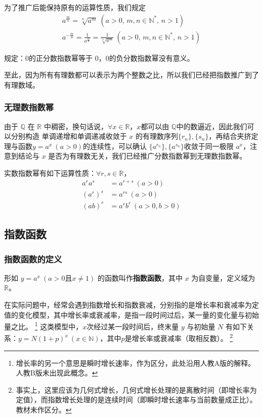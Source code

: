 \documentclass[a4paper,openany]{ctexbook}
\begin{document}
为了推广后能保持原有的运算性质，我们规定
\begin{gather*}
    a^{\frac{m}{n}}=\sqrt[n]{a^m}\ (a>0,\, m,n\in \mathbb{N} ^*,\, n>1)\\
    a^{-\frac{m}{n}}=\frac{1}{a^{\frac{m}{n}}}=\frac{1}{\sqrt[n]{a^m}}\ (a>0,\, m,n\in \mathbb{N} ^*,\, n>1)
\end{gather*}

规定：\(0\)的正分数指数幂等于 \(0\)，\(0\)的负分数指数幂没有意义。

至此，因为所有有理数都可以表示为两个整数之比，所以我们已经把指数推广到了有理数域。

\subsubsection{无理数指数幂}

由于 \(\mathbb{Q} \) 在 \(\mathbb{R} \) 中稠密，换句话说，\(\forall x\in \mathbb{R} \)，\(x\)都可以由 \(\mathbb{Q} \)中的数逼近，因此我们可以分别构造
单调递增和单调递减收敛于 \(x\) 的有理数序列\(\{r_n\},\{s_n\}\)，再结合夹挤定理与函数\(y=a^x\ (a>0)\)的连续性，可以确认
\(\{a^{r_n}\},\{a^{s_n}\}\)收敛于同一极限 \(a^x\)，注意到结论与 \(x\) 是否为有理数无关，我们已经推广分数指数幂到无理数指数幂。

实数指数幂有如下运算性质：\(\forall r,s \in \mathbb{R} \)，
\begin{align*}
    a^r a^s & =a^{r+s}\ (a>0)     \\
    (a^r)^s & = a^{rs}\ (a>0)     \\
    (ab)^r  & =a^r b^r\ (a>0,b>0)
\end{align*}

\subsection{指数函数}

\subsubsection{指数函数的定义}

形如 \(y=a^x\ (a>0\text{且}x\ne 1)\) 的函数叫作\textbf{指数函数}，其中 \(x\) 为自变量，定义域为 \(\mathbb{R} \)。

在实际问题中，经常会遇到指数增长和指数衰减，分别指的是增长率和衰减率为定值的变化模型，其中增长率或衰减率，是指一段时间过后，某一量的变化量与初始量之比。%
\footnote{增长率的另一个意思是瞬时增长速率，作为区分，此处沿用人教A版的解释。人教B版未出现此概念。}%
这类模型中，\(x\)次经过某一段时间后，终末量 \(y\) 与初始量 \(N\) 有如下关系：\(y=N(1+p)^x\ (x\in \mathbb{N} )\)，其中\(p\)是增长率或衰减率（取相反数）。%
\footnote{事实上，这里应该为几何式增长，几何式增长处理的是离散时间（即增长率为定值），而指数增长处理的是连续时间（即瞬时增长速率与当前数量成正比）。教材未作区分。}
\end{document}
